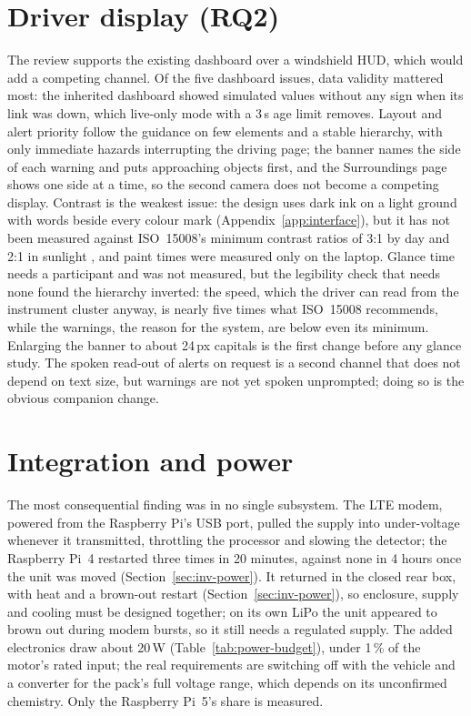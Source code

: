 \section{Driver display (RQ2)}
\label{sec:disc-display}

The review supports the existing dashboard over a windshield HUD, which would add a competing channel. Of the five dashboard issues, data validity mattered most: the inherited dashboard showed simulated values without any sign when its link was down, which live-only mode with a 3\,s age limit removes. Layout and alert priority follow the guidance on few elements and a stable hierarchy, with only immediate hazards interrupting the driving page; the banner names the side of each warning and puts approaching objects first, and the Surroundings page shows one side at a time, so the second camera does not become a competing display. Contrast is the weakest issue: the design uses dark ink on a light ground with words beside every colour mark (Appendix~\ref{app:interface}), but it has not been measured against ISO~15008's minimum contrast ratios of 3:1 by day and 2:1 in sunlight \cite{iso15008}, and paint times were measured only on the laptop. Glance time needs a participant and was not measured, but the legibility check that needs none found the hierarchy inverted: the speed, which the driver can read from the instrument cluster anyway, is nearly five times what ISO~15008 recommends, while the warnings, the reason for the system, are below even its minimum. Enlarging the banner to about 24\,px capitals is the first change before any glance study. The spoken read-out of alerts on request is a second channel that does not depend on text size, but warnings are not yet spoken unprompted; doing so is the obvious companion change.

\section{Integration and power}
\label{sec:disc-power}

The most consequential finding was in no single subsystem. The LTE modem, powered from the Raspberry Pi's USB port, pulled the supply into under-voltage whenever it transmitted, throttling the processor and slowing the detector; the Raspberry Pi~4 restarted three times in 20 minutes, against none in 4 hours once the unit was moved (Section~\ref{sec:inv-power}). It returned in the closed rear box, with heat and a brown-out restart (Section~\ref{sec:inv-power}), so enclosure, supply and cooling must be designed together; on its own LiPo the unit appeared to brown out during modem bursts, so it still needs a regulated supply. The added electronics draw about 20\,W (Table~\ref{tab:power-budget}), under 1\,\% of the motor's rated input; the real requirements are switching off with the vehicle and a converter for the pack's full voltage range, which depends on its unconfirmed chemistry. Only the Raspberry Pi~5's share is measured.

